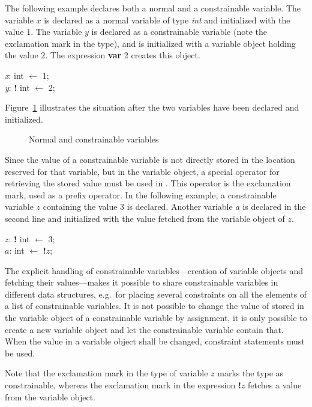 The following example declares both a normal and a constrainable
variable.  The variable $x$ is declared as a normal variable of type
{\em int} and initialized with the value $1$.  The variable $y$ is
declared as a constrainable variable (note the exclamation mark in the
type), and is initialized with a variable object holding the value
$2$.  The expression {\bf var} 2 creates this object.
%
\begin{ttlprog}
\>\ttlVar{} {\em x}: int $\leftarrow$ 1;\\
\>\ttlVar{} {\em y}: {\bf!} int $\leftarrow$ \ttlVar{} 2;
\end{ttlprog}
%
Figure~\ref{pic:constrainable-vars} illustrates the situation after
the two variables have been declared and initialized.

\begin{figure}[htp]
\begin{center}

\end{center}
\caption{Normal and constrainable variables}
\label{pic:constrainable-vars}
\end{figure}

%
Since the value of a constrainable variable is not directly stored in
the location reserved for that variable, but in the variable object, a
special operator for retrieving the stored value must be used in
\turtle{}.  This operator is the exclamation mark, used as a prefix
operator.  In the following example, a constrainable variable $z$
containing the value 3 is declared.  Another variable $a$ is declared
in the second line and initialized with the value fetched from the
variable object of $z$.
%
\begin{ttlprog}
\>\ttlVar{} $z$: {\bf!} int $\leftarrow$ \ttlVar{} 3;\\
\>\ttlVar{} $a$: int $\leftarrow$ {\bf!}$z$;
\end{ttlprog}
%
The explicit handling of constrainable variables---creation of
variable objects and fetching their values---makes it possible to
share constrainable variables in different data structures, e.g.~for
placing several constraints on all the elements of a list of
constrainable variables.  It is not possible to change the value of
stored in the variable object of a constrainable variable by
assignment, it is only possible to create a new variable object and
let the constrainable variable contain that.  When the value in a
variable object shall be changed, constraint statements must be used.

Note that the exclamation mark in the type of variable $z$ marks the
type as constrainable, whereas the exclamation mark in the expression
{\bf !}$z$ fetches a value from the variable object.

